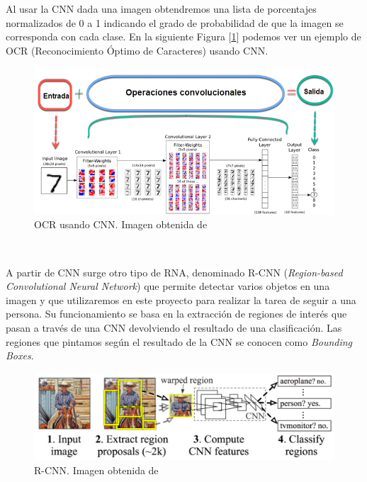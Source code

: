 Al usar la CNN dada una imagen obtendremos una lista de porcentajes normalizados de 0 a 1 indicando el grado de probabilidad de que la imagen se corresponda con cada clase. En la siguiente Figura [\ref{fig:ocr_cnn}] podemos ver un ejemplo de OCR (Reconocimiento Óptimo de Caracteres) usando CNN.\\

\begin{figure}[H]
  \begin{center}
    \includegraphics[width=15cm]{imagenes/cap1/ocr-cnn.png}
  \end{center}
  \caption[OCR usando CNN)]{OCR usando CNN. Imagen obtenida de \cite{dnn}}
  \label{fig:ocr_cnn}
\end{figure}\

A partir de CNN surge otro tipo de RNA, denominado R-CNN (\textit{Region-based Convolutional Neural Network}) que permite detectar varios objetos en una imagen y que utilizaremos en este proyecto para realizar la tarea de seguir a una persona. Su funcionamiento se basa en la extracción de regiones de interés que pasan a través de una CNN devolviendo el resultado de una clasificación. Las regiones que pintamos según el resultado de la CNN se conocen como \textit{Bounding Boxes}.

\begin{figure}[H]
  \begin{center}
    \includegraphics[width=15cm]{imagenes/cap1/r-cnn.png}
  \end{center}
  \caption[Ejemplo de R-CNN]{R-CNN. Imagen obtenida de \cite{r-cnn}}
  \label{fig:r-cnn}
\end{figure}\

